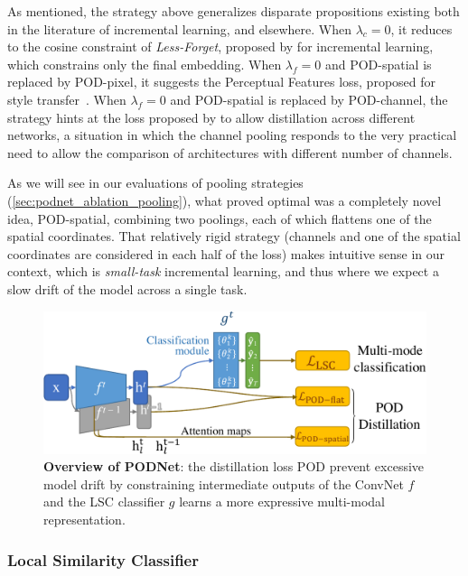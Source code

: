 As mentioned, the strategy above generalizes disparate propositions existing both in the literature
of incremental learning, and elsewhere. When $\lambda_{c}=0$, it reduces to the cosine constraint of
\textit{Less-Forget}, proposed by \cite{hou2019ucir} for incremental learning, which constrains only the
final embedding. When $\lambda_{f}=0$ and POD-spatial is replaced by POD-pixel,
it suggests the Perceptual Features loss, proposed for style
transfer~\citep{johnson2016perceptual_losses}. When $\lambda_{f}=0$ and POD-spatial is replaced by
POD-channel, the strategy hints at the loss proposed by \cite{zagoruyko2016distillation_attention}
to allow distillation across different networks, a situation in which the channel pooling responds
to the very practical need to allow the comparison of architectures with different number of
channels.

As we will see in our evaluations of pooling strategies (\autoref{sec:podnet_ablation_pooling}),
what proved optimal was a completely novel idea, POD-spatial, combining two poolings, each of which
flattens one of the spatial coordinates. That relatively rigid strategy (channels and one of the
spatial coordinates are considered in each half of the loss) makes intuitive sense in our context,
which is \textit{small-task} incremental learning, and thus where we expect a slow drift of the
model across a single task.


\begin{figure}[t]
    \begin{center}
        \includegraphics[width=0.8\linewidth]{images/podnet/model}
    \end{center}
    \caption{\textbf{Overview of PODNet}: the distillation loss POD prevent excessive model drift by
        constraining intermediate outputs of the ConvNet $f$ and the LSC classifier $g$ learns a
        more expressive multi-modal representation.}
    \label{fig:model}
\end{figure}

\subsubsection{Local Similarity Classifier}
\label{sec:podnet_local_classifier}

